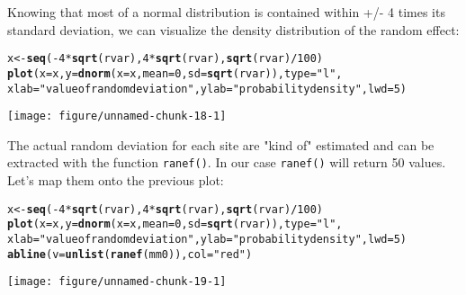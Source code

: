 \documentclass[12pt,a4paper]{scrartcl}\usepackage[]{graphicx}\usepackage[]{color}
\makeatletter
\def\maxwidth{ %
  \ifdim\Gin@nat@width>\linewidth
    \linewidth
  \else
    \Gin@nat@width
  \fi
}
\newcommand{\hlnum}[1]{\textcolor[rgb]{0.686,0.059,0.569}{#1}}%
\newcommand{\hlstr}[1]{\textcolor[rgb]{0.192,0.494,0.8}{#1}}%
\newcommand{\hlopt}[1]{\textcolor[rgb]{0,0,0}{#1}}%
\newcommand{\hlstd}[1]{\textcolor[rgb]{0.345,0.345,0.345}{#1}}%
\newcommand{\hlkwb}[1]{\textcolor[rgb]{0.69,0.353,0.396}{#1}}%
\newcommand{\hlkwc}[1]{\textcolor[rgb]{0.333,0.667,0.333}{#1}}%
\newcommand{\hlkwd}[1]{\textcolor[rgb]{0.737,0.353,0.396}{\textbf{#1}}}%
\newenvironment{kframe}{%
 \def\at@end@of@kframe{}%
 \ifinner\ifhmode%
  \def\at@end@of@kframe{\end{minipage}}%
  \begin{minipage}{\columnwidth}%
 \fi\fi%
 \def\FrameCommand##1{\hskip\@totalleftmargin \hskip-\fboxsep
 \colorbox{shadecolor}{##1}\hskip-\fboxsep
     \hskip-\linewidth \hskip-\@totalleftmargin \hskip\columnwidth}%
 \MakeFramed {\advance\hsize-\width
   \@totalleftmargin\z@ \linewidth\hsize
   \@setminipage}}%
 {\par\unskip\endMakeFramed%
 \at@end@of@kframe}
\newenvironment{knitrout}{}{} %
\makeatother
\begin{document}
Knowing that most of a normal distribution is contained within +/- 4 times its standard deviation, we can visualize the density distribution of the random effect:
\begin{knitrout}
\color{fgcolor}\begin{kframe}
\begin{alltt}
\hlstd{x} \hlkwb{<-} \hlkwd{seq}\hlstd{(}\hlopt{-}\hlnum{4}\hlopt{*}\hlkwd{sqrt}\hlstd{(rvar),}\hlnum{4}\hlopt{*}\hlkwd{sqrt}\hlstd{(rvar),}\hlkwd{sqrt}\hlstd{(rvar)}\hlopt{/}\hlnum{100}\hlstd{)}
\hlkwd{plot}\hlstd{(}\hlkwc{x}\hlstd{=x,} \hlkwc{y}\hlstd{=}\hlkwd{dnorm}\hlstd{(}\hlkwc{x} \hlstd{= x,} \hlkwc{mean} \hlstd{=}\hlnum{0} \hlstd{,} \hlkwc{sd} \hlstd{=} \hlkwd{sqrt}\hlstd{(rvar)),} \hlkwc{type}\hlstd{=}\hlstr{"l"}\hlstd{,}
     \hlkwc{xlab}\hlstd{=} \hlstr{"value of random deviation"}\hlstd{,} \hlkwc{ylab}\hlstd{=}\hlstr{"probability density"}\hlstd{,} \hlkwc{lwd}\hlstd{=}\hlnum{5}\hlstd{)}
\end{alltt}
\end{kframe}
\texttt{[image: figure/unnamed-chunk-18-1]} 

\end{knitrout}

The actual random deviation for each site are "kind of" estimated and can be extracted with the function \texttt{ranef()}. In our case \texttt{ranef()} will return 50 values. Let's map them onto the previous plot:

\begin{knitrout}
\color{fgcolor}\begin{kframe}
\begin{alltt}
\hlstd{x} \hlkwb{<-} \hlkwd{seq}\hlstd{(}\hlopt{-}\hlnum{4}\hlopt{*}\hlkwd{sqrt}\hlstd{(rvar),}\hlnum{4}\hlopt{*}\hlkwd{sqrt}\hlstd{(rvar),}\hlkwd{sqrt}\hlstd{(rvar)}\hlopt{/}\hlnum{100}\hlstd{)}
\hlkwd{plot}\hlstd{(}\hlkwc{x}\hlstd{=x,} \hlkwc{y}\hlstd{=}\hlkwd{dnorm}\hlstd{(}\hlkwc{x} \hlstd{= x,} \hlkwc{mean} \hlstd{=}\hlnum{0} \hlstd{,} \hlkwc{sd} \hlstd{=} \hlkwd{sqrt}\hlstd{(rvar)),} \hlkwc{type}\hlstd{=}\hlstr{"l"}\hlstd{,}
     \hlkwc{xlab}\hlstd{=} \hlstr{"value of random deviation"}\hlstd{,} \hlkwc{ylab}\hlstd{=}\hlstr{"probability density"}\hlstd{,} \hlkwc{lwd}\hlstd{=}\hlnum{5}\hlstd{)}
\hlkwd{abline}\hlstd{(}\hlkwc{v}\hlstd{=}\hlkwd{unlist}\hlstd{(}\hlkwd{ranef}\hlstd{(mm0)),} \hlkwc{col}\hlstd{=} \hlstr{"red"}\hlstd{)}
\end{alltt}
\end{kframe}
\texttt{[image: figure/unnamed-chunk-19-1]} 

\end{knitrout}
\end{document}
